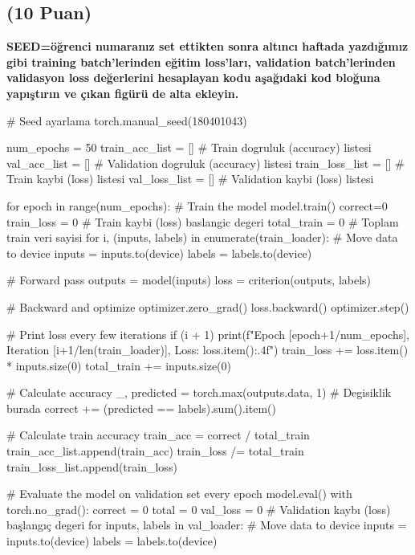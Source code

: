 \documentclass[11pt]{article}
\begin{document}
\subsection{(10 Puan)} \textbf{SEED=öğrenci numaranız set ettikten sonra altıncı haftada yazdığımız gibi training batch'lerinden eğitim loss'ları, validation batch'lerinden validasyon loss değerlerini hesaplayan kodu aşağıdaki kod bloğuna yapıştırın ve çıkan figürü de alta ekleyin.}

\begin{python}
# Seed ayarlama
torch.manual_seed(180401043)

num_epochs = 50
train_acc_list = [] # Train dogruluk (accuracy) listesi
val_acc_list = [] # Validation dogruluk (accuracy) listesi
train_loss_list = [] # Train kaybi (loss) listesi
val_loss_list = [] # Validation kaybi (loss) listesi

for epoch in range(num_epochs):
    # Train the model
    model.train()
    correct=0
    train_loss = 0 # Train kaybi (loss) baslangic degeri
    total_train = 0 # Toplam train veri sayisi
    for i, (inputs, labels) in enumerate(train_loader):
        # Move data to device
        inputs = inputs.to(device)
        labels = labels.to(device)

        # Forward pass
        outputs = model(inputs)
        loss = criterion(outputs, labels)

        # Backward and optimize
        optimizer.zero_grad()
        loss.backward()
        optimizer.step()

        # Print loss every few iterations
        if (i + 1) %
            print(f"Epoch [{epoch+1}/{num_epochs}], Iteration [{i+1}/{len(train_loader)}], Loss: {loss.item():.4f}")
        train_loss += loss.item() * inputs.size(0)
        total_train += inputs.size(0)
        
        # Calculate accuracy
        _, predicted = torch.max(outputs.data, 1)  # Degisiklik burada
        correct += (predicted == labels).sum().item()
    
    # Calculate train accuracy
    train_acc = correct / total_train
    train_acc_list.append(train_acc)
    train_loss /= total_train
    train_loss_list.append(train_loss)

    # Evaluate the model on validation set every epoch
    model.eval()
    with torch.no_grad():
        correct = 0
        total = 0
        val_loss = 0 # Validation kaybı (loss) başlangıç degeri
        for inputs, labels in val_loader:
            # Move data to device
            inputs = inputs.to(device)
            labels = labels.to(device)


\end{python}
\end{document}
